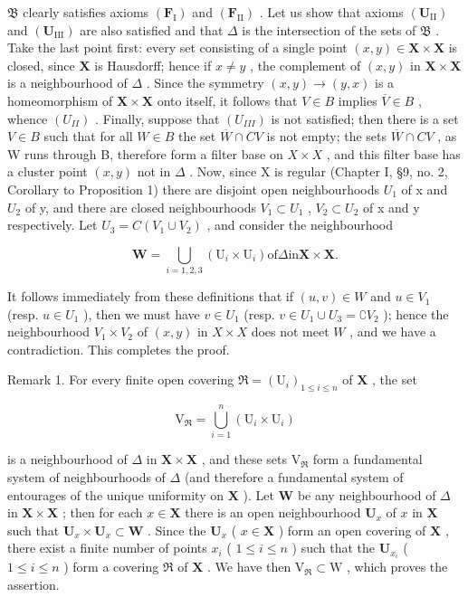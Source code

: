 \(\mathfrak{B}\) clearly satisfies axioms \((\mathbf{F}_{\mathrm{I}})\) and \((\mathbf{F}_{\mathrm{II}})\) . Let us show that axioms \((\mathbf{U}_{\mathrm{II}})\) and \((\mathbf{U}_{\mathrm{III}})\) are also satisfied and that \(\Delta\) is the intersection of the sets of \(\mathfrak{B}\) . Take the last point first: every set consisting of a single point \((x, y) \in \mathbf{X} \times \mathbf{X}\) is closed, since \(\mathbf{X}\) is Hausdorff; hence if \(x \neq y\) , the complement of \((x, y)\) in \(\mathbf{X} \times \mathbf{X}\) is a neighbourhood of \(\Delta\) . Since the symmetry \((x, y) \to (y, x)\) is a homeomorphism of \(\mathbf{X} \times \mathbf{X}\) onto itself, it follows that \(V \in B\) implies \(\overline{V} \in B\) , whence \((U_{II})\) . Finally, suppose that \((U_{III})\) is not satisfied; then there is a set \(V \in B\) such that for all \(W \in B\) the set \(\overline{W} \cap C V\) is not empty; the sets \(\overline{W} \cap C V\) , as W runs through B, therefore form a filter base on \(X \times X\) , and this filter base has a cluster point \((x, y)\) not in \(\Delta\) . Now, since X is regular (Chapter I, §9, no. 2, Corollary to Proposition 1) there are disjoint open neighbourhoods \(U_{1}\) of x and \(U_{2}\) of y, and there are closed neighbourhoods \(V_{1} \subset U_{1}\) , \(V_{2} \subset U_{2}\) of x and y respectively. Let \(U_{3} = C(V_{1} \cup V_{2})\) , and consider the neighbourhood

\[
\mathbf {W} = \bigcup_ {i = 1, 2, 3} (\mathrm{U} _ {i} \times \mathrm{U} _ {i}) \text {of} \Delta \text {in} \mathbf {X} \times \mathbf {X}.
\]

It follows immediately from these definitions that if \((u, v) \in W\) and \(u \in V_1\) (resp. \(u \in U_1\) ), then we must have \(v \in U_1\) (resp. \(v \in U_1 \cup U_3 = \complement V_2\) ); hence the neighbourhood \(V_1 \times V_2\) of \((x, y)\) in \(X \times X\) does not meet \(W\) , and we have a contradiction. This completes the proof.

Remark 1. For every finite open covering \(\Re = (\mathrm{U}_i)_{1\leqslant i\leqslant n}\) of \(\mathbf{X}\) , the set

\[
\mathrm{V} _ {\Re} = \bigcup_ {i = 1} ^ {n} \left(\mathrm{U} _ {i} \times \mathrm{U} _ {i}\right)
\]

is a neighbourhood of \(\Delta\) in \(\mathbf{X} \times \mathbf{X}\) , and these sets \(\mathrm{V}_{\Re}\) form a fundamental system of neighbourhoods of \(\Delta\) (and therefore a fundamental system of entourages of the unique uniformity on \(\mathbf{X}\) ). Let \(\mathbf{W}\) be any neighbourhood of \(\Delta\) in \(\mathbf{X} \times \mathbf{X}\) ; then for each \(x \in \mathbf{X}\) there is an open neighbourhood \(\mathbf{U}_x\) of \(x\) in \(\mathbf{X}\) such that \(\mathbf{U}_x \times \mathbf{U}_x \subset \mathbf{W}\) . Since the \(\mathbf{U}_x\) ( \(x \in \mathbf{X}\) ) form an open covering of \(\mathbf{X}\) , there exist a finite number of points \(x_i\) ( \(1 \leqslant i \leqslant n\) ) such that the \(\mathbf{U}_{x_i}\) ( \(1 \leqslant i \leqslant n\) ) form a covering \(\Re\) of \(\mathbf{X}\) . We have then \(\mathrm{V}_{\Re} \subset \mathrm{W}\) , which proves the assertion.

